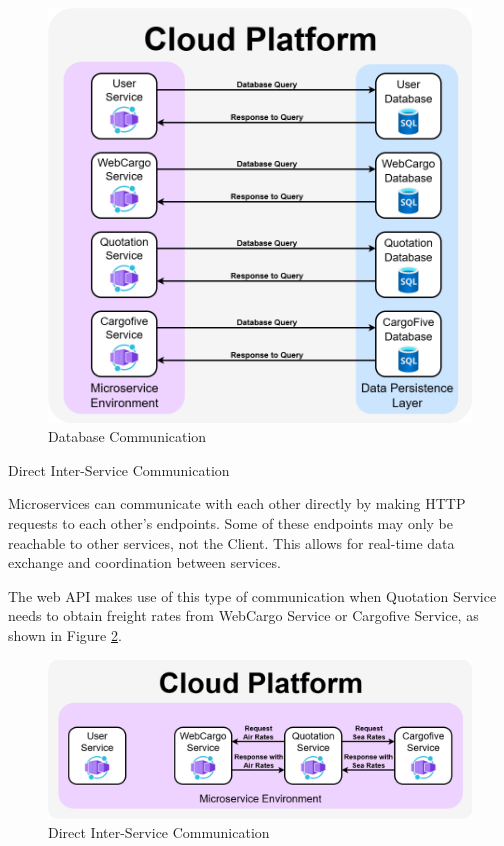 \documentclass[12pt, reqno, oneside]{amsbook}
\makeatletter
\def\subsection{\@startsection{subsection}{2}%
      \z@{.5\linespacing\@plus.7\linespacing}{.25\linespacing}%
      {\normalfont\bfseries\flushleft}}
\theoremstyle{definition}
\theoremstyle{definition}
\numberwithin{section}{chapter}
\numberwithin{table}{chapter}
\numberwithin{figure}{chapter}
\makeatother
\begin{document}
\begin{figure}[H]
  \centering
  \includegraphics[width=0.9\linewidth]{images/DatabaseCommunication.png}
  \caption{\label{Figure:DatabaseCommunication}Database Communication}
\end{figure}

\pagebreak

\subsection{Direct Inter-Service Communication}
\label{Subsection:Direct_Inter_Service_Communication}

Microservices can communicate with each other directly by making \ac{HTTP} requests to each other's endpoints. Some of these endpoints may only be reachable to other services, not the Client. This allows for real-time data exchange and coordination between services.

The web \ac{API} makes use of this type of communication when Quotation Service needs to obtain freight rates from WebCargo Service or Cargofive Service, as shown in Figure \ref{Figure:DirectCommunication}.

\begin{figure}[H]
  \centering
  \includegraphics[width=1\linewidth]{images/DirectCommunication.png}
  \caption{\label{Figure:DirectCommunication}Direct Inter-Service Communication}
\end{figure}
\end{document}
